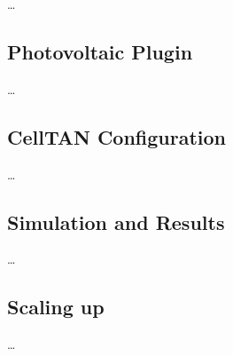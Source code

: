 \dots

\subsection{Photovoltaic Plugin}

\dots

\subsection{CellTAN Configuration}

\dots

\subsection{Simulation and Results} \label{subsec:results}

\dots

\subsection{Scaling up}

\dots


